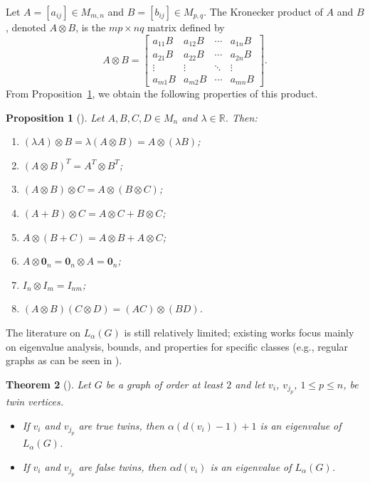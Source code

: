 \documentclass{article}
\newtheorem{theorem}{Theorem}[section]
\newtheorem{proposition}[theorem]{Proposition}
\begin{document}
Let \( A = [a_{ij}] \in M_{m,n} \) and \( B = [b_{ij}] \in M_{p,q} \). The Kronecker product of \( A \) and \( B \), denoted \( A \otimes B \), is the \(mp \times nq\) matrix defined by
\[
A \otimes B =
\begin{bmatrix}
a_{11}B & a_{12}B & \cdots & a_{1n}B \\
a_{21}B & a_{22}B & \cdots & a_{2n}B \\
\vdots & \vdots & \ddots & \vdots \\
a_{m1}B & a_{m2}B & \cdots & a_{mn}B
\end{bmatrix}.
\]
From Proposition~\ref{prop_Kronecker}, we obtain the following properties of this product.

\begin{proposition}
[\cite{broxson_2006}]\label{prop_Kronecker}
Let \(A,B,C, D \in M_{n}\) and \(\lambda \in \mathbb{R}\). Then:
\begin{enumerate}
\item[(1)] \((\lambda A) \otimes B = \lambda (A \otimes B) = A \otimes (\lambda B)\);
\item[(2)] \((A \otimes B)^{T} = A^{T} \otimes B^{T}\);
\item[(3)] \((A \otimes B) \otimes C = A \otimes (B \otimes C)\);
\item[(4)] \((A + B) \otimes C = A \otimes C + B \otimes C\);
\item[(5)] \(A \otimes (B + C) = A \otimes B + A \otimes C\);
\item[(6)] \(A \otimes \mathbf{0}_{n} = \mathbf{0}_{n} \otimes A = \mathbf{0}_{n}\);
\item[(7)] \(I_{n} \otimes I_{m} = I_{nm}\);
\item[(8)] \( (A\otimes B)(C\otimes D) = (AC) \otimes (BD)\).
\end{enumerate}
\end{proposition}

The literature on $L_\alpha(G)$ is still relatively limited; existing works focus mainly on eigenvalue analysis, bounds, and properties for specific classes (e.g., regular graphs as can be seen in \cite{Wang2020, Fakieh2024, Carla2022}).

\begin{theorem}[\cite{Carla2022}]\label{theo:twins}
Let $G$ be a graph of order at least $2$ and let $v_i$, $v_{j_p}$, $1\le p\le n$, be twin vertices.
\begin{itemize}
\item[(1)] If $v_i$ and $v_{j_p}$ are true twins, then $\alpha(d(v_i)-1)+1$ is an eigenvalue of $L_\alpha(G)$.
\item[(2)] If $v_i$ and $v_{j_p}$ are false twins, then $\alpha d(v_i)$ is an eigenvalue of $L_\alpha(G)$.
\end{itemize}
\end{theorem}
\end{document}
